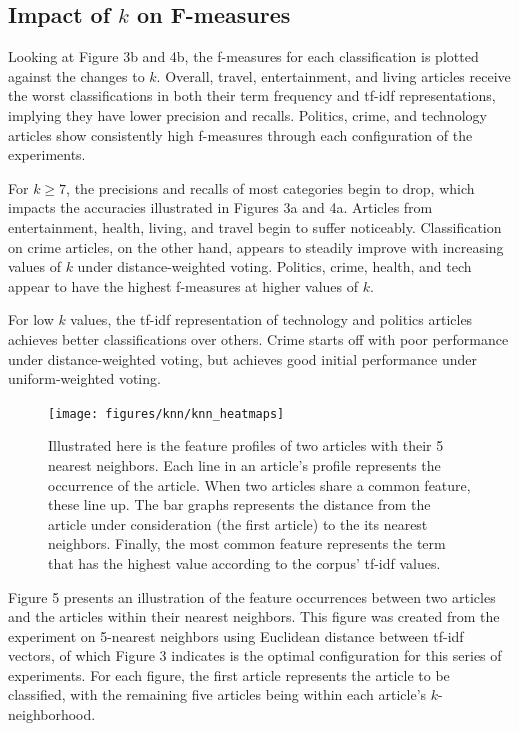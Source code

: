 \documentclass[11pt]{article}
\begin{document}
\subsection{Impact of $k$ on F-measures}

Looking at Figure 3b and 4b, the f-measures for each classification is plotted against the changes to $k$.
Overall, travel, entertainment, and living articles receive the worst classifications in both their term frequency and tf-idf representations, implying they have lower precision and recalls.
Politics, crime, and technology articles show consistently high f-measures through each configuration of the experiments.

For $k\ge7$, the precisions and recalls of most categories begin to drop, which impacts the accuracies illustrated in Figures 3a and 4a.
Articles from entertainment, health, living, and travel begin to suffer noticeably.
Classification on crime articles, on the other hand, appears to steadily improve with increasing values of $k$ under distance-weighted voting.
Politics, crime, health, and tech appear to have the highest f-measures at higher values of $k$.

For low $k$ values, the tf-idf representation of technology and politics articles achieves better classifications over others.
Crime starts off with poor performance under distance-weighted voting, but achieves good initial performance under uniform-weighted voting.


\begin{figure}[h!] \label{fig:heatmap_neighborhoods}
  \centering
  \texttt{[image: figures/knn/knn\_heatmaps]}
  \caption{Illustrated here is the feature profiles of two articles with their 5 nearest neighbors.
  Each line in an article's profile represents the occurrence of the article.
  When two articles share a common feature, these line up.
  The bar graphs represents the distance from the article under consideration (the first article) to the its nearest neighbors.
  Finally, the most common feature represents the term that has the highest value according to the corpus' tf-idf values.}
\end{figure}

Figure 5 presents an illustration of the feature occurrences between two articles and the articles within their nearest neighbors.
This figure was created from the experiment on 5-nearest neighbors using Euclidean distance between tf-idf vectors, of which Figure 3 indicates is the optimal configuration for this series of experiments.
For each figure, the first article represents the article to be classified, with the remaining five articles being within each article's $k$-neighborhood.
\end{document}
